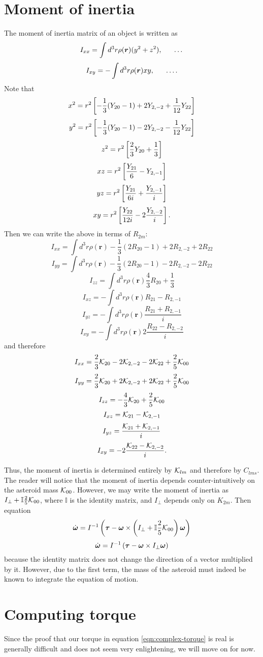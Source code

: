 \documentclass[aps,twocolumn,secnumarabic,balancelastpage,amsmath,amssymb,nofootinbib,floatfix]{revtex4-1}
\begin{document}
\clearpage


\section{Moment of inertia}
The moment of inertia matrix of an object is written as
$$I_{xx}=\int d^3 r \rho(\bm r) (y^2 + z^2), \indent \dots$$
$$I_{xy}=-\int d^3 r \rho(\bm r) xy, \indent \dots.$$
Note that
$$x^2=r^2\left[ -\frac{1}{3}(Y_{20}-1)+2Y_{2,-2}+\frac{1}{12}Y_{22} \right]$$
$$y^2=r^2\left[ -\frac{1}{3}(Y_{20}-1)-2Y_{2,-2}-\frac{1}{12}Y_{22} \right]$$
$$z^2=r^2\left[ \frac{2}{3}Y_{20}+\frac{1}{3} \right]$$
$$xz=r^2\left[ \frac{Y_{21}}{6}-Y_{2,-1} \right]$$
$$yz=r^2\left[ \frac{Y_{21}}{6i}+\frac{Y_{2,-1}}{i} \right]$$
$$xy=r^2\left[ \frac{Y_{22}}{12i}-2\frac{Y_{2,-2}}{i} \right].$$
Then we can write the above in terms of $R_{2m}$:
$$I_{xx}=\int d^3r \rho(\bm r)-\frac{1}{3}(2R_{20}-1)+2R_{2,-2}+2R_{22}$$
$$I_{yy}=\int d^3r \rho(\bm r)-\frac{1}{3}(2R_{20}-1)-2R_{2,-2}-2R_{22}$$
$$I_{zz}=\int d^3r \rho(\bm r)\frac{4}{3}R_{20}+\frac{1}{3}$$
$$I_{xz}=-\int d^3r \rho(\bm r)R_{21}-R_{2,-1}$$
$$I_{yz}=-\int d^3r \rho(\bm r)\frac{R_{21}+R_{2,-1}}{i}$$
$$I_{xy}=-\int d^3r \rho(\bm r)2\frac{R_{22}-R_{2,-2}}{i}$$
and therefore
$$I_{xx}=\frac{2}{3}\mathcal{K}_{20}-2\mathcal{K}_{2,-2}-2\mathcal{K}_{22}+\frac{2}{5}\mathcal{K}_{00}$$
$$I_{yy}=\frac{2}{3}\mathcal{K}_{20}+2\mathcal{K}_{2,-2}+2\mathcal{K}_{22}+\frac{2}{5}\mathcal{K}_{00}$$
$$I_{zz}=-\frac{4}{3}\mathcal{K}_{20} + \frac{2}{5}\mathcal{K}_{00}$$
$$I_{xz}=\mathcal{K}_{21}-\mathcal{K}_{2,-1}$$
$$I_{yz}=\frac{\mathcal{K}_{21}+\mathcal{K}_{2,-1}}{i}$$
$$I_{xy}=-2\frac{\mathcal{K}_{22}-\mathcal{K}_{2,-2}}{i}.$$

Thus, the moment of inertia is determined entirely by $\mathcal{K}_{lm}$ and therefore by $C_{lms}$. The reader will notice that the moment of inertia depends counter-intuitively on the asteroid mass $\mathcal{K}_{00}$. However, we may write the moment of inertia as $I_\perp+\mathbb{I}\frac{2}{5}\mathcal{K}_{00}$, where $\mathbb{I}$ is the identity matrix, and $I_\perp$ depends only on $K_{2m}$. Then equation $$\dot{\bm \omega} = I^{-1}\left( \bm \tau - \bm \omega \times \left( I_\perp+\mathbb{I}\frac{2}{5}\mathcal{K}_{00} \right) \bm \omega \right)$$
$$\dot{\bm \omega} = I^{-1}\left( \bm \tau - \bm \omega \times I_\perp\bm \omega \right)$$
because the identity matrix does not change the direction of a vector multiplied by it. However, due to the first term, the mass of the asteroid must indeed be known to integrate the equation of motion.



\section{Computing torque}
Since the proof that our torque in equation \ref{eqn:complex-torque} is real is generally difficult and does not seem very enlightening, we will move on for now.
\end{document}
